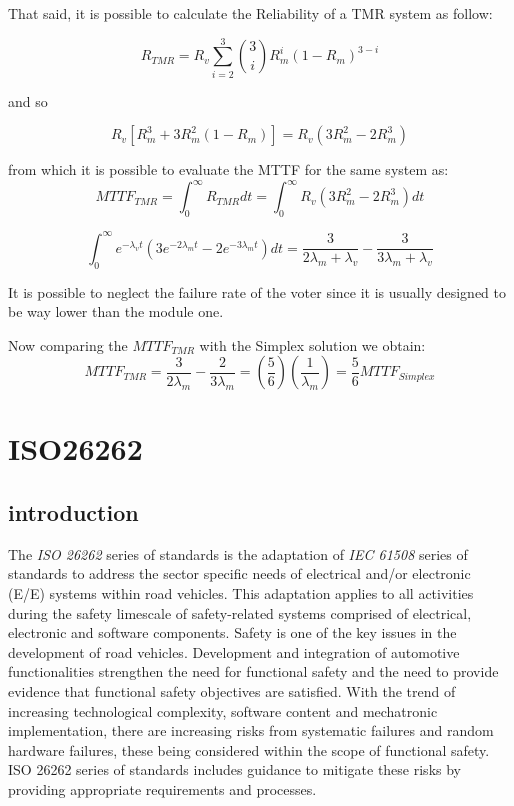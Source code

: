 \documentclass[./dissertation.tex]{subfiles}
\begin{document}
That said, it is possible to calculate the Reliability of a TMR system as follow:

\begin{equation}
    R_{TMR} = R_v \sum_{i=2}^{3} \binom{3}{i} R^i_m (1-R_m)^{3-i}
\end{equation}

and so 

\begin{equation}
    R_v [R_m^3 + 3R_m^2(1-R_m)] = R_v(3R^2_m - 2R_m^3)
\end{equation}

from which it is possible to evaluate the MTTF for the same system as:
\begin{equation}
MTTF_{TMR} = \int_0^{\infty}R_{TMR} dt = \int_0^{\infty}R_v (3R^2_m -2R^3_m)dt 
\end{equation}

\begin{equation}
\int_0^{\infty} e^{-\lambda_v t}\left( 3e^{-2\lambda_m t} -2e^{-3\lambda_m t}  \right) dt = \frac{3}{2\lambda_m + \lambda_v} - \frac{3}{3\lambda_m + \lambda_v}
\end{equation} 

It is possible to neglect the failure rate of the voter since it is usually designed to be way lower than the module one.

Now comparing the $MTTF_{TMR}$ with the Simplex solution we obtain:
\begin{equation}
    MTTF_{TMR} = \frac{3}{2\lambda_m} - \frac{2}{3\lambda_m} = \left( \frac{5}{6}\right) \left( \frac{1}{\lambda_m}\right) = \frac{5}{6} MTTF_{Simplex}
\end{equation}
\label{sec:iniziare}


\chapter{ISO26262}

\section{introduction}

The \textit{ISO 26262} series of standards is the adaptation of \textit{IEC 61508} series of standards to address the sector specific needs of electrical and/or electronic (E/E) systems within road vehicles. This adaptation applies to all activities during the safety limescale of safety-related systems comprised of electrical, electronic and software components. Safety is one of the key issues in the development of road vehicles. Development and integration of automotive functionalities strengthen the need for functional safety and the need to provide evidence that functional safety objectives are satisfied. With the trend of increasing technological complexity, software content and mechatronic implementation, there are increasing risks from systematic failures and random hardware failures, these being considered within the scope of functional safety. ISO 26262 series of standards includes guidance to mitigate these risks by providing appropriate requirements and processes.
\end{document}
